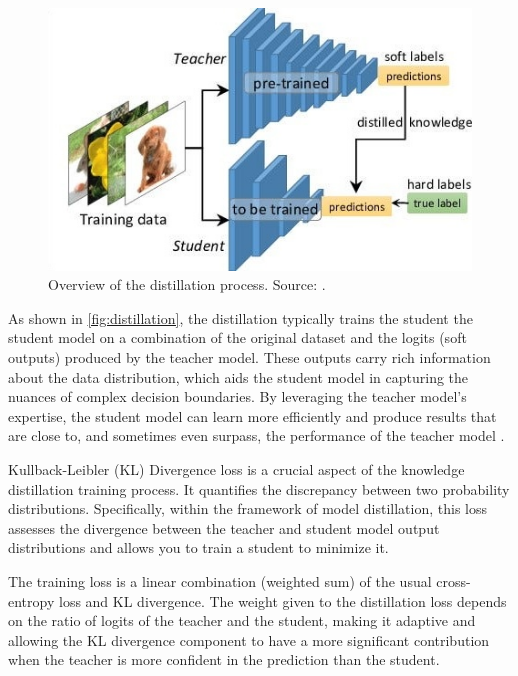 \begin{figure}[hbt]
    \centering
    \includegraphics[width=0.7\linewidth]{figs/distillation.jpg}
    \caption[Overview of the distillation process.]{Overview of the distillation process. Source: \cite{kd_simplified}.}
    \label{fig:distillation}
\end{figure}

As shown in \autoref{fig:distillation}, the distillation typically trains the student the student model on a combination of the original dataset and the logits (soft outputs) produced by the teacher model. These outputs carry rich information about the data distribution, which aids the student model in capturing the nuances of complex decision boundaries. By leveraging the teacher model's expertise, the student model can learn more efficiently and produce results that are close to, and sometimes even surpass, the performance of the teacher model \cite{distilling}.

Kullback-Leibler (KL) Divergence loss \cite{kl} is a crucial aspect of the knowledge distillation training process. It quantifies the discrepancy between two probability distributions. Specifically, within the framework of model distillation, this loss assesses the divergence between the teacher and student model output distributions and allows you to train a student to minimize it.

The training loss is a linear combination (weighted sum) of the usual cross-entropy loss and KL divergence. The weight given to the distillation loss depends on the ratio of logits of the teacher and the student, making it adaptive and allowing the KL divergence component to have a more significant contribution when the teacher is more confident in the prediction than the student.

